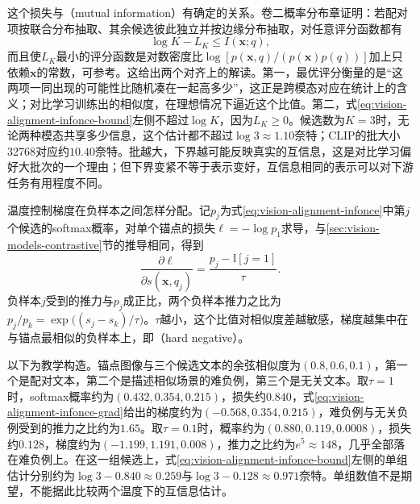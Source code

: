 这个损失与（mutual information）有确定的关系。卷二概率分布章证明：若配对项按联合分布抽取、其余候选彼此独立并按边缘分布抽取，对任意评分函数都有
\begin{equation}
  \log K-L_K\leq I(\bm x;q),
  \label{eq:vision-alignment-infonce-bound}
\end{equation}
而且使$L_K$最小的评分函数是对数密度比$\log[p(\bm x,q)/(p(\bm x)p(q))]$加上只依赖$\bm x$的常数，可参考。这给出两个对齐上的解读。第一，最优评分衡量的是“这两项一同出现的可能性比随机凑在一起高多少”，这正是跨模态对应在统计上的含义；对比学习训练出的相似度，在理想情况下逼近这个比值。第二，式\eqref{eq:vision-alignment-infonce-bound}左侧不超过$\log K$，因为$L_K\geq0$。候选数为$K=3$时，无论两种模态共享多少信息，这个估计都不超过$\log3\approx1.10$奈特；CLIP的批大小32768对应约$10.40$奈特。批越大，下界越可能反映真实的互信息，这是对比学习偏好大批次的一个理由；但下界变紧不等于表示变好，互信息相同的表示可以对下游任务有用程度不同。

温度控制梯度在负样本之间怎样分配。记$p_j$为式\eqref{eq:vision-alignment-infonce}中第$j$个候选的softmax概率，对单个锚点的损失$\ell=-\log p_1$求导，与\ref{sec:vision-models-contrastive}节的推导相同，得到
\begin{equation}
  \frac{\partial\ell}{\partial s(\bm x,q_j)}=\frac{p_j-\mathbb I[j=1]}{\tau}.
  \label{eq:vision-alignment-infonce-grad}
\end{equation}
负样本$j$受到的推力与$p_j$成正比，两个负样本推力之比为$p_j/p_k=\exp\bigl((s_j-s_k)/\tau\bigr)$。$\tau$越小，这个比值对相似度差越敏感，梯度越集中在与锚点最相似的负样本上，即（hard negative）。

\begin{example}[温度对负样本梯度的分配]
  \label{ex:vision-alignment-temperature}
  以下为教学构造。锚点图像与三个候选文本的余弦相似度为$(0.8,0.6,0.1)$，第一个是配对文本，第二个是描述相似场景的难负例，第三个是无关文本。取$\tau=1$时，softmax概率约为$(0.432,0.354,0.215)$，损失约$0.840$，式\eqref{eq:vision-alignment-infonce-grad}给出的梯度约为$(-0.568,0.354,0.215)$，难负例与无关负例受到的推力之比约为$1.65$。取$\tau=0.1$时，概率约为$(0.880,0.119,0.0008)$，损失约$0.128$，梯度约为$(-1.199,1.191,0.008)$，推力之比约为$e^{5}\approx148$，几乎全部落在难负例上。在这一组候选上，式\eqref{eq:vision-alignment-infonce-bound}左侧的单组估计分别约为$\log3-0.840\approx0.259$与$\log3-0.128\approx0.971$奈特。单组数值不是期望，不能据此比较两个温度下的互信息估计。
\end{example}

